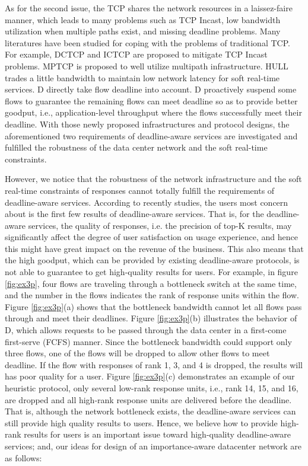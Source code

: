 \documentclass[conference]{IEEEtran}
\begin{document}
As for the second issue, the TCP shares the network resources in a laissez-faire manner, which leads to many problems such as TCP Incast\cite{incast2}, low bandwidth utilization when multiple paths exist\cite{mptcp}, and missing deadline\cite{deadline} problems. Many literatures have been studied for coping with the problems of traditional TCP. For example, DCTCP\cite{dctcp} and ICTCP\cite{ictcp} are proposed to mitigate TCP Incast problems. MPTCP\cite{mptcp} is proposed to well utilize multipath infrastructure. HULL\cite{hull} trades a little bandwidth to maintain low network latency for soft real-time services. D\cite{deadline} directly take flow deadline into account. D proactively suspend some flows to guarantee the remaining flows can meet deadline so as to provide better goodput, i.e., application-level throughput where the flows successfully meet their deadline. With those newly proposed infrastructures and protocol designs, the aforementioned two requirements of deadline-aware services are investigated and fulfilled the robustness of the data center network and the soft real-time constraints.

However, we notice that the robustness of the network infrastructure and the soft real-time constraints of responses cannot totally fulfill the requirements of deadline-aware services. According to recently studies\cite{lagun2011viewser, buscher2010good, cutrell2007you, lorigo2008eye}, the users most concern about is the first few results of deadline-aware services. That is, for the deadline-aware services, the quality of responses, i.e. the precision of top-K results, may significantly affect the degree of user satisfaction on usage experience, and hence this might have great impact on the revenue of the business. This also means that the high goodput, which can be provided by existing deadline-aware protocols\cite{deadline}, is not able to guarantee to get high-quality results for users. For example, in figure \ref{fig:ex3p}, four flows are traveling through a bottleneck switch at the same time, and the number in the flows indicates the rank of response units within the flow. Figure \ref{fig:ex3p}(a) shows that the bottleneck bandwidth cannot let all flows pass through and meet their deadlines. Figure \ref{fig:ex3p}(b) illustrates the behavior of D, which allows requests to be passed through the data center in a first-come first-serve (FCFS) manner. Since the bottleneck bandwidth could support only three flows, one of the flows will be dropped to allow other flows to meet deadline. If the flow with responses of rank 1, 3, and 4 is dropped, the results will has poor quality for a user. Figure \ref{fig:ex3p}(c) demonstrates an example of our heuristic protocol, only several low-rank response units, i.e., rank 14, 15, and 16, are dropped and all high-rank response units are delivered before the deadline. That is, although the network bottleneck exists, the deadline-aware services can still provide high quality results to users. Hence, we believe how to provide high-rank results for users is an important issue toward high-quality deadline-aware services; and, our ideas for design of an importance-aware datacenter network are as follows:
\end{document}
